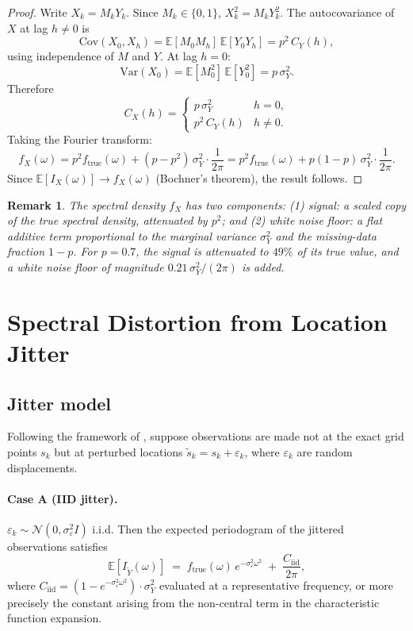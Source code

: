 \documentclass[12pt]{article}
\newtheorem{remark}{Remark}
\begin{document}
\begin{proof}
Write $X_k = M_k Y_k$.  Since $M_k \in \{0,1\}$,
$X_k^2 = M_k Y_k^2$.
The autocovariance of $X$ at lag $h \neq 0$ is
\[
  \mathrm{Cov}(X_0, X_h)
  = \mathbb{E}[M_0 M_h]\,\mathbb{E}[Y_0 Y_h]
  = p^2\,C_Y(h),
\]
using independence of $M$ and $Y$.
At lag $h = 0$:
\[
  \mathrm{Var}(X_0)
  = \mathbb{E}[M_0^2]\,\mathbb{E}[Y_0^2]
  = p\,\sigma^2_Y.
\]
Therefore
\[
  C_X(h) = \begin{cases}
    p\,\sigma^2_Y & h = 0, \\
    p^2\,C_Y(h) & h \neq 0.
  \end{cases}
\]
Taking the Fourier transform:
\[
  f_X(\omega)
  = p^2 f_{\mathrm{true}}(\omega)
    + (p - p^2)\,\sigma^2_Y \cdot \frac{1}{2\pi}
  = p^2 f_{\mathrm{true}}(\omega)
    + p(1-p)\,\sigma^2_Y \cdot \frac{1}{2\pi}.
\]
Since $\mathbb{E}[I_X(\omega)] \to f_X(\omega)$ (Bochner's theorem), the
result follows.
\end{proof}

\begin{remark}
The spectral density $f_X$ has two components:
(1) \emph{signal}: a scaled copy of the true spectral density,
    attenuated by $p^2$; and
(2) \emph{white noise floor}: a flat additive term proportional to the
    marginal variance $\sigma^2_Y$ and the missing-data fraction $1-p$.
For $p=0.7$, the signal is attenuated to $49\%$ of its true value, and
a white noise floor of magnitude $0.21\,\sigma^2_Y/(2\pi)$ is added.
\end{remark}


\section{Spectral Distortion from Location Jitter}

\subsection{Jitter model}

Following the framework of \citet[Section 1]{pdf_jitter_ref},
suppose observations are made not at the exact grid points $s_k$ but at
perturbed locations $\tilde{s}_k = s_k + \varepsilon_k$, where
$\varepsilon_k$ are random displacements.

\paragraph{Case A (IID jitter).}
$\varepsilon_k \sim \mathcal{N}(0, \sigma^2_\varepsilon I)$ i.i.d.
Then the expected periodogram of the jittered observations satisfies
\[
    \mathbb{E}[I_{\tilde{Y}}(\omega)]
    \;=\; f_{\mathrm{true}}(\omega)\,e^{-\sigma^2_\varepsilon \omega^2}
        \;+\; \frac{C_{\mathrm{iid}}}{2\pi},
\]
where $C_{\mathrm{iid}} = (1 - e^{-\sigma^2_\varepsilon \omega^2})
\cdot \sigma^2_Y$ evaluated at a representative frequency, or more
precisely the constant arising from the non-central term in the
characteristic function expansion.
\end{document}
